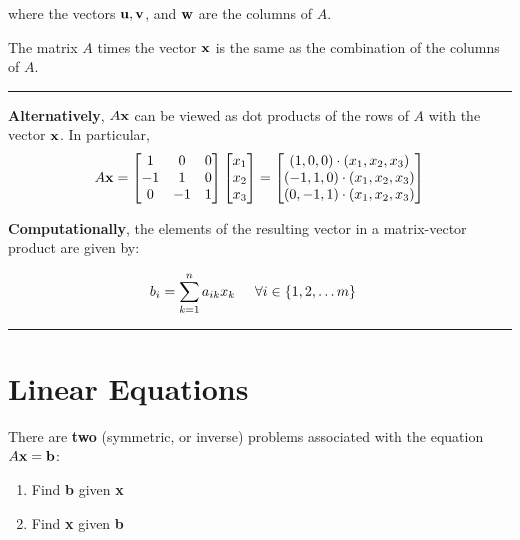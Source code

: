 where the vectors ${\bf u}, {\bf v}$, and ${\bf w}$ are the columns of $A$.

The matrix $A$ times the vector ${\bf x}$ is the same as the combination of the columns of $A$.  

\rule[0.01in]{\textwidth}{0.0025in}


\textbf{Alternatively}, $A{\bf x}$ can be viewed as dot products of the rows of $A$ with the vector ${\bf x}$.  In particular, 
\[  A {\bf x} = \begin{bmatrix}  1 & 0 & 0 \\-1 & 1 & 0 \\0 & -1 & 1 \end{bmatrix}  \begin{bmatrix}  x_1 \\x_2 \\x_3 \end{bmatrix} 
=   \begin{bmatrix}  (1, 0, 0) \cdot (x_1,x_2,x_3) \\ (-1, 1, 0) \cdot (x_1,x_2,x_3) \\ (0, -1, 1) \cdot (x_1,x_2,x_3) \end{bmatrix}
 \]
 
 \textbf{Computationally}, the elements of the resulting vector in a matrix-vector product are given by:
 

\begin{align*}
	b_{i} &= \sum_{k=1}^n  a_{ik} x_{k}  \hspace{0.5cm}  \forall i \in \{1, 2, \dots m \}
\end{align*}



\rule[0.01in]{\textwidth}{0.0025in}

 
 
 
 
 
 
 
 
 
 
%
%
\section{Linear Equations}

There are \textbf{two} (symmetric, or inverse) problems associated with the equation $A{\bf x} = {\bf b}$:
\begin{enumerate}
	\item Find {\bf b} given {\bf x}
	\item {\color{blue}Find} {\bf x} given  {\bf b}
\end{enumerate}


